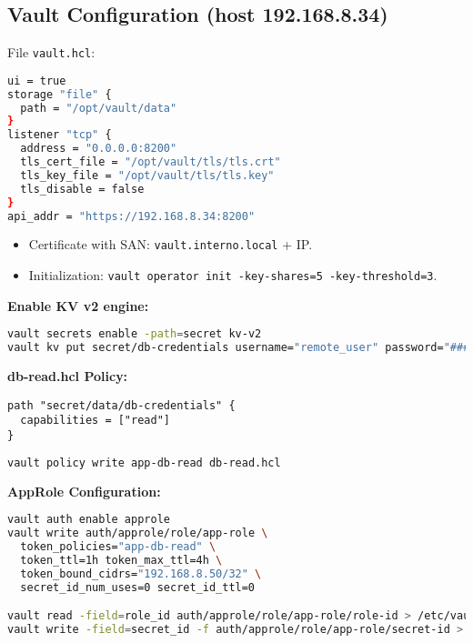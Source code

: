 \documentclass[12pt]{report}
\begin{document}
\subsection*{Vault Configuration (host 192.168.8.34)}

File \texttt{vault.hcl}:

\begin{lstlisting}[language=bash, caption={vault.hcl}]
ui = true
storage "file" {
  path = "/opt/vault/data"
}
listener "tcp" {
  address = "0.0.0.0:8200"
  tls_cert_file = "/opt/vault/tls/tls.crt"
  tls_key_file = "/opt/vault/tls/tls.key"
  tls_disable = false
}
api_addr = "https://192.168.8.34:8200"
\end{lstlisting}

\begin{itemize}
    \item Certificate with SAN: \texttt{vault.interno.local} + IP.
    \item Initialization: \texttt{vault operator init -key-shares=5 -key-threshold=3}.
\end{itemize}

\textbf{Enable KV v2 engine:}
\begin{lstlisting}[language=bash]
vault secrets enable -path=secret kv-v2
vault kv put secret/db-credentials username="remote_user" password="######"
\end{lstlisting}

\textbf{db-read.hcl Policy:}
\begin{lstlisting}[language=hcl]
path "secret/data/db-credentials" {
  capabilities = ["read"]
}
\end{lstlisting}

\begin{lstlisting}[language=bash]
vault policy write app-db-read db-read.hcl
\end{lstlisting}

\textbf{AppRole Configuration:}
\begin{lstlisting}[language=bash]
vault auth enable approle
vault write auth/approle/role/app-role \
  token_policies="app-db-read" \
  token_ttl=1h token_max_ttl=4h \
  token_bound_cidrs="192.168.8.50/32" \
  secret_id_num_uses=0 secret_id_ttl=0

vault read -field=role_id auth/approle/role/app-role/role-id > /etc/vault/role_id
vault write -field=secret_id -f auth/approle/role/app-role/secret-id > /etc/vault/secret_id
\end{lstlisting}
\end{document}
